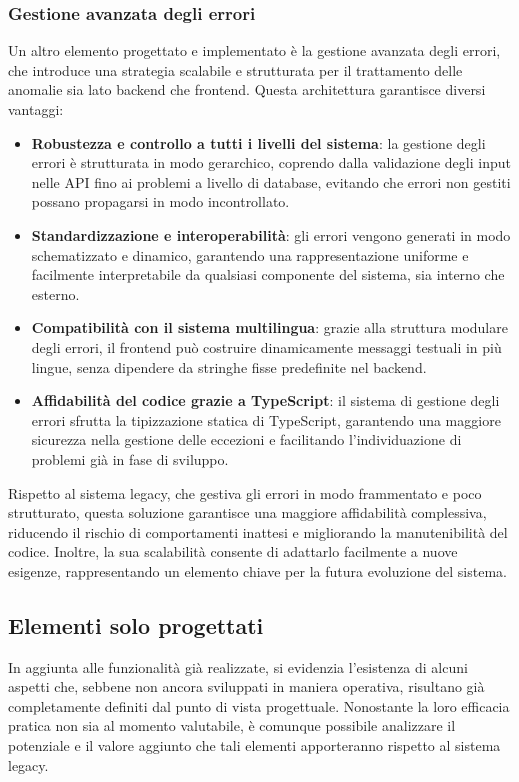 \subsubsection{Gestione avanzata degli errori}
Un altro elemento progettato e implementato è la gestione avanzata degli errori, che introduce una strategia scalabile e strutturata per il trattamento delle anomalie sia lato backend che frontend.
%
Questa architettura garantisce diversi vantaggi:
\begin{itemize}
  \item \textbf{Robustezza e controllo a tutti i livelli del sistema}: la gestione degli errori è strutturata in modo gerarchico, coprendo dalla validazione degli input nelle API fino ai problemi a livello di database, evitando che errori non gestiti possano propagarsi in modo incontrollato.
  \item \textbf{Standardizzazione e interoperabilità}: gli errori vengono generati in modo schematizzato e dinamico, garantendo una rappresentazione uniforme e facilmente interpretabile da qualsiasi componente del sistema, sia interno che esterno.
  \item \textbf{Compatibilità con il sistema multilingua}: grazie alla struttura modulare degli errori, il frontend può costruire dinamicamente messaggi testuali in più lingue, senza dipendere da stringhe fisse predefinite nel backend.
  \item \textbf{Affidabilità del codice grazie a TypeScript}: il sistema di gestione degli errori sfrutta la tipizzazione statica di TypeScript, garantendo una maggiore sicurezza nella gestione delle eccezioni e facilitando l’individuazione di problemi già in fase di sviluppo.
\end{itemize}

Rispetto al sistema legacy, che gestiva gli errori in modo frammentato e poco strutturato, questa soluzione garantisce una maggiore affidabilità complessiva, riducendo il rischio di comportamenti inattesi e migliorando la manutenibilità del codice. Inoltre, la sua scalabilità consente di adattarlo facilmente a nuove esigenze, rappresentando un elemento chiave per la futura evoluzione del sistema.

\subsection{Elementi solo progettati}
In aggiunta alle funzionalità già realizzate, si evidenzia l’esistenza di alcuni aspetti che, sebbene non ancora sviluppati in maniera operativa, risultano già completamente definiti dal punto di vista progettuale. Nonostante la loro efficacia pratica non sia al momento valutabile, è comunque possibile analizzare il potenziale e il valore aggiunto che tali elementi apporteranno rispetto al sistema legacy.


